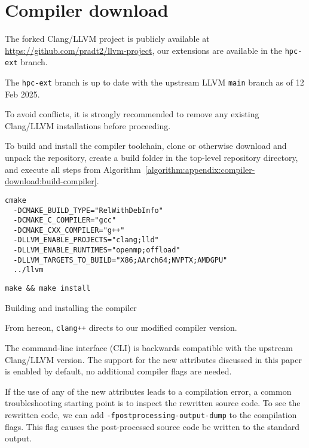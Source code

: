 \section{Compiler download}
\label{appendix:compiler-download}

The forked Clang/LLVM project is publicly available at
\linebreak 
\url{https://github.com/pradt2/llvm-project}, our extensions are available in the \texttt{hpc-ext} branch.

The \texttt{hpc-ext} branch is up to date with the upstream LLVM \texttt{main} branch as of 12 Feb 2025.

To avoid conflicts, it is strongly recommended to remove any existing Clang/LLVM installations before proceeding.

To build and install the compiler toolchain, clone or otherwise download and unpack the repository, create a build folder in the top-level repository directory, and execute all steps from Algorithm~\ref{algorithm:appendix:compiler-download:build-compiler}.

\begin{algorithm}[htb]
    \begin{algorithmic}[1]
      \State 
      \begin{verbatim}
cmake 
  -DCMAKE_BUILD_TYPE="RelWithDebInfo" 
  -DCMAKE_C_COMPILER="gcc" 
  -DCMAKE_CXX_COMPILER="g++" 
  -DLLVM_ENABLE_PROJECTS="clang;lld" 
  -DLLVM_ENABLE_RUNTIMES="openmp;offload" 
  -DLLVM_TARGETS_TO_BUILD="X86;AArch64;NVPTX;AMDGPU"
  ../llvm
      \end{verbatim}
\State \verb|make && make install|
    \end{algorithmic}
  \caption{
    Building and installing the compiler
    \label{algorithm:appendix:compiler-download:build-compiler}
    }
\end{algorithm}

\noindent

From hereon, \texttt{clang++} directs to our modified compiler version.



The command-line interface (CLI) is backwards compatible with the upstream
Clang/LLVM version. 
The support for the new attributes discussed in this paper is enabled by default, no additional compiler flags are needed.

If the use of any of the new attributes leads to a compilation error, a common
troubleshooting starting point is to inspect the rewritten source code. To see
the rewritten code, we can add \texttt{-fpostprocessing-output-dump} to the
compilation flags. This flag causes the post-processed source code be written to the standard output.
